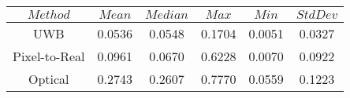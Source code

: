 \begin{table}[h]
\centering
\begin{tabular}{|c|c|c|c|c|c|}
\hline
$Method$ & $Mean$ & $Median$ & $Max$ & $Min$ & $StdDev$ \\
\hline
UWB & 0.0536 & 0.0548 & 0.1704 & 0.0051 & 0.0327 \\
\hline
Pixel-to-Real & 0.0961 & 0.0670 & 0.6228 & 0.0070 & 0.0922 \\
\hline
Optical & 0.2743 & 0.2607 & 0.7770 & 0.0559 & 0.1223 \\
\hline
\end{tabular}
\end{table}
